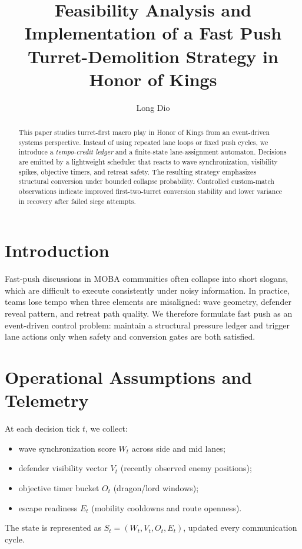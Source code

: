 \documentclass[runningheads]{llncs}
\title{Feasibility Analysis and Implementation of a Fast Push Turret-Demolition Strategy in Honor of Kings}
\author{Long Dio}
\institute{Entertainment Strategy Research Group\\
\email{contact@example.com}}
\begin{document}
\maketitle

\begin{abstract}
This paper studies turret-first macro play in Honor of Kings from an event-driven systems perspective. Instead of using repeated lane loops or fixed push cycles, we introduce a \emph{tempo-credit ledger} and a finite-state lane-assignment automaton. Decisions are emitted by a lightweight scheduler that reacts to wave synchronization, visibility spikes, objective timers, and retreat safety. The resulting strategy emphasizes structural conversion under bounded collapse probability. Controlled custom-match observations indicate improved first-two-turret conversion stability and lower variance in recovery after failed siege attempts.
\end{abstract}

\section{Introduction}
Fast-push discussions in MOBA communities often collapse into short slogans, which are difficult to execute consistently under noisy information. In practice, teams lose tempo when three elements are misaligned: wave geometry, defender reveal pattern, and retreat path quality.
We therefore formulate fast push as an event-driven control problem: maintain a structural pressure ledger and trigger lane actions only when safety and conversion gates are both satisfied.

\section{Operational Assumptions and Telemetry}
At each decision tick $t$, we collect:
\begin{itemize}
\item wave synchronization score $W_t$ across side and mid lanes;
\item defender visibility vector $V_t$ (recently observed enemy positions);
\item objective timer bucket $O_t$ (dragon/lord windows);
\item escape readiness $E_t$ (mobility cooldowns and route openness).
\end{itemize}
The state is represented as $S_t=(W_t,V_t,O_t,E_t)$, updated every communication cycle.
\end{document}
